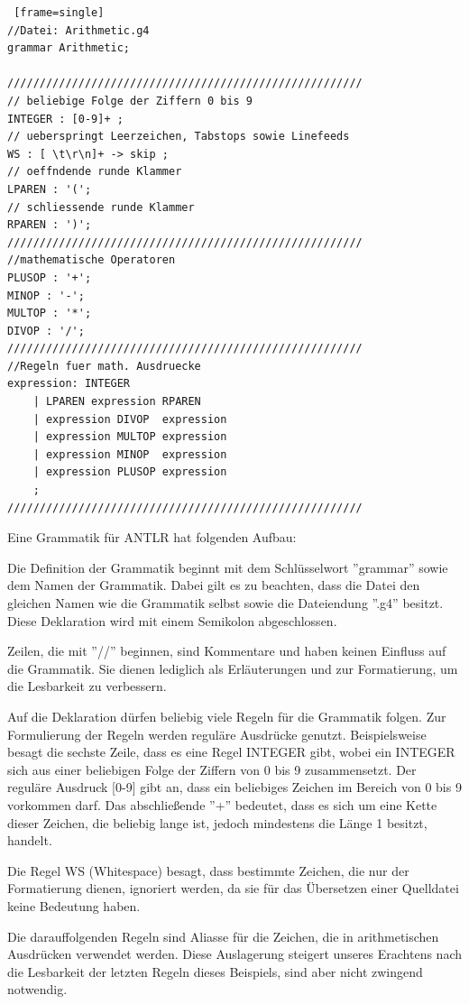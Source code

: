 \documentclass[12pt, a4paper, oneside, ngerman]{article}
\begin{document}
\begin{lstlisting} [frame=single] 
//Datei: Arithmetic.g4
grammar Arithmetic;

///////////////////////////////////////////////////////
// beliebige Folge der Ziffern 0 bis 9
INTEGER : [0-9]+ ;        
// ueberspringt Leerzeichen, Tabstops sowie Linefeeds
WS : [ \t\r\n]+ -> skip ; 
// oeffndende runde Klammer
LPAREN : '(';		  	  
// schliessende runde Klammer
RPAREN : ')';		  	  
///////////////////////////////////////////////////////
//mathematische Operatoren
PLUSOP : '+';
MINOP : '-';
MULTOP : '*';
DIVOP : '/';
///////////////////////////////////////////////////////
//Regeln fuer math. Ausdruecke
expression: INTEGER					
	| LPAREN expression RPAREN		
	| expression DIVOP  expression  
	| expression MULTOP expression	
	| expression MINOP  expression 
	| expression PLUSOP expression 
	;			
///////////////////////////////////////////////////////

\end{lstlisting}

Eine Grammatik für ANTLR hat folgenden Aufbau:

Die Definition der Grammatik beginnt mit dem Schlüsselwort ''grammar'' sowie dem Namen der Grammatik. Dabei gilt es zu beachten, dass die Datei den gleichen Namen wie die Grammatik selbst sowie die Dateiendung ''.g4'' besitzt. Diese Deklaration wird mit einem Semikolon abgeschlossen.

Zeilen, die mit ''//'' beginnen, sind Kommentare und haben keinen Einfluss auf die Grammatik. Sie dienen lediglich als Erläuterungen und zur Formatierung, um die Lesbarkeit zu verbessern.

Auf die Deklaration dürfen beliebig viele Regeln für die Grammatik folgen. Zur Formulierung der Regeln werden reguläre Ausdrücke genutzt. Beispielsweise besagt die sechste Zeile, dass es eine Regel INTEGER gibt, wobei ein INTEGER sich aus einer beliebigen Folge der Ziffern von 0 bis 9 zusammensetzt. Der reguläre Ausdruck [0-9] gibt an, dass ein beliebiges Zeichen im Bereich von 0 bis 9 vorkommen darf. Das abschließende ''+'' bedeutet, dass es sich um eine Kette dieser Zeichen, die beliebig lange ist, jedoch mindestens die Länge 1 besitzt, handelt.

Die Regel WS (Whitespace) besagt, dass bestimmte Zeichen, die nur der Formatierung dienen, ignoriert werden, da sie für das Übersetzen einer Quelldatei keine Bedeutung haben.

Die darauffolgenden Regeln sind Aliasse für die Zeichen, die in arithmetischen Ausdrücken verwendet werden. Diese Auslagerung steigert unseres Erachtens nach die Lesbarkeit der letzten Regeln dieses Beispiels, sind aber nicht zwingend notwendig.
\end{document}

